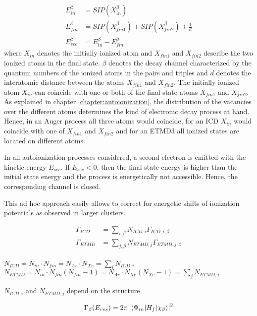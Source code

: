 \begin{align}
 E_{in}^\beta  &= SIP(X_{in}^\beta) \label{equation:E_in}\\
 E_{fin}^\beta &= SIP(X_{fin1}^\beta) + SIP(X_{fin2}^\beta) + \frac 1d
           \label{equation:E_fin}\\
 E_{sec}^\beta &= E_{in}^\beta - E_{fin}^\beta \label{equation:E_sec}
\end{align}
where $X_{in}$ denotes the initially ionized atom and
$X_{fin1}$ and $X_{fin2}$ describe the two ionized
atoms in the final state. $\beta$ denotes the decay channel characterized
by the quantum numbers of the ionized atoms in the pairs
and triples and $d$ denotes the interatomic distance between the atoms
$X_{fin1}$ and $X_{fin2}$. The initially ionized atom $X_{in}$ can
coincide with one or both of
the final state atoms
$X_{fin1}$ and $X_{fin2}$. As explained in
chapter \ref{chapter:autoionization}, the distribution
of the vacancies over the different
atoms determines the kind of electronic decay process at hand. Hence, in an
Auger process all three atoms would coincide, for an ICD $X_{in}$
would coincide with one of $X_{fin1}$ and $X_{fin2}$ and for an {ETMD}3
all ionized states are located on different atoms.

In all autoionization processes considered, a second electron
is emitted with the kinetic energy $E_{sec}$. If $E_{sec}<0$, then
the final state energy is higher than the initial state energy and the        
process is energetically not accessible. Hence, the corresponding channel     
is closed.
                                                               
This ad hoc approach easily allows to correct for energetic shifts of         
ionization potentials as observed in larger clusters.

\begin{align}
 \Gamma_{ICD}  &= \sum\limits_{i,\beta} N_{ICD,i}  \Gamma_{ICD,i,\beta}\\
 \Gamma_{ETMD} &= \sum\limits_{j,\beta} N_{ETMD,j} \Gamma_{ETMD,j,\beta}\\
\end{align}

$N_{ICD} = N_{in} \cdot N_{fin} = N_{Ar} \cdot N_{Xe}
 = \sum\limits_i N_{ICD,i}$
$N_{ETMD} = N_{in} \cdot N_{fin} (N_{fin} - 1) = N_{Ar} \cdot N_{Xe} (N_{Xe} - 1)
 = \sum\limits_j N_{ETMD,j}$

$N_{ICD,i}$ and $N_{ETMD,j}$ depend on the structure

\begin{equation}
 \Gamma_{\beta}(E_{res}) = 2\pi \left|
                           \braket{\Phi_{in}| H_f |\chi_{\beta}}
                           \right|^2
\end{equation}

